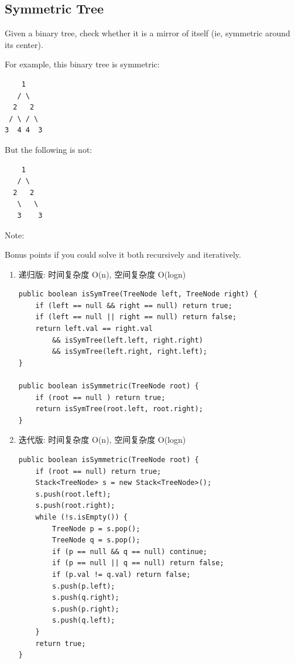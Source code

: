 \documentclass[12pt]{book}
\begin{document}
\subsection{Symmetric Tree}
\label{sec-4-2-9}
Given a binary tree, check whether it is a mirror of itself (ie, symmetric around its center).

For example, this binary tree is symmetric:
\lstset{language=java,label= ,caption= ,numbers=none}
\begin{lstlisting}
    1
   / \
  2   2
 / \ / \
3  4 4  3
\end{lstlisting}
But the following is not:
\lstset{language=java,label= ,caption= ,numbers=none}
\begin{lstlisting}
    1
   / \
  2   2
   \   \
   3    3
\end{lstlisting}
Note:

Bonus points if you could solve it both recursively and iteratively.
\begin{enumerate}
\item 递归版: 时间复杂度 O(n), 空间复杂度 O(logn)
\label{sec-4-2-9-1}

\lstset{language=java,label= ,caption= ,numbers=none}
\begin{lstlisting}
public boolean isSymTree(TreeNode left, TreeNode right) {
    if (left == null && right == null) return true;
    if (left == null || right == null) return false;
    return left.val == right.val
        && isSymTree(left.left, right.right)
        && isSymTree(left.right, right.left);
}

public boolean isSymmetric(TreeNode root) {
    if (root == null ) return true;
    return isSymTree(root.left, root.right);
}
\end{lstlisting}

\item 迭代版: 时间复杂度 O(n), 空间复杂度 O(logn)
\label{sec-4-2-9-2}

\lstset{language=java,label= ,caption= ,numbers=none}
\begin{lstlisting}
public boolean isSymmetric(TreeNode root) {
    if (root == null) return true;
    Stack<TreeNode> s = new Stack<TreeNode>();
    s.push(root.left);
    s.push(root.right);
    while (!s.isEmpty()) {
        TreeNode p = s.pop();
        TreeNode q = s.pop();
        if (p == null && q == null) continue;
        if (p == null || q == null) return false;
        if (p.val != q.val) return false;
        s.push(p.left);
        s.push(q.right);
        s.push(p.right);
        s.push(q.left);
    }
    return true;
}
\end{lstlisting}
\end{enumerate}
\end{document}

